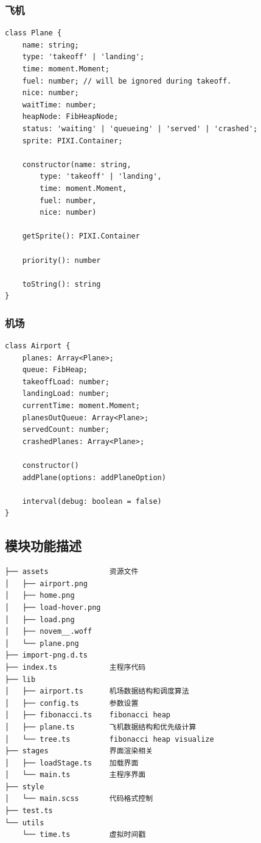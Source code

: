\documentclass{ctexart}
\begin{document}
\subsubsection{飞机}
\begin{verbatim}
class Plane {
    name: string;
    type: 'takeoff' | 'landing';
    time: moment.Moment;
    fuel: number; // will be ignored during takeoff.
    nice: number;
    waitTime: number;
    heapNode: FibHeapNode;
    status: 'waiting' | 'queueing' | 'served' | 'crashed';
    sprite: PIXI.Container;

    constructor(name: string,
        type: 'takeoff' | 'landing',
        time: moment.Moment,
        fuel: number,
        nice: number)

    getSprite(): PIXI.Container

    priority(): number

    toString(): string
}
\end{verbatim}
\subsubsection{机场}
\begin{verbatim}
class Airport {
    planes: Array<Plane>;
    queue: FibHeap;
    takeoffLoad: number;
    landingLoad: number;
    currentTime: moment.Moment;
    planesOutQueue: Array<Plane>;
    servedCount: number;
    crashedPlanes: Array<Plane>;

    constructor()
    addPlane(options: addPlaneOption)

    interval(debug: boolean = false)
}
\end{verbatim}
\subsection{模块功能描述}
\begin{verbatim}
├── assets              资源文件
│   ├── airport.png
│   ├── home.png
│   ├── load-hover.png
│   ├── load.png
│   ├── novem__.woff
│   └── plane.png
├── import-png.d.ts
├── index.ts            主程序代码
├── lib
│   ├── airport.ts      机场数据结构和调度算法
│   ├── config.ts       参数设置
│   ├── fibonacci.ts    fibonacci heap
│   ├── plane.ts        飞机数据结构和优先级计算
│   └── tree.ts         fibonacci heap visualize
├── stages              界面渲染相关
│   ├── loadStage.ts    加载界面
│   └── main.ts         主程序界面
├── style
│   └── main.scss       代码格式控制
├── test.ts
└── utils
    └── time.ts         虚拟时间戳
\end{verbatim}
\end{document}
